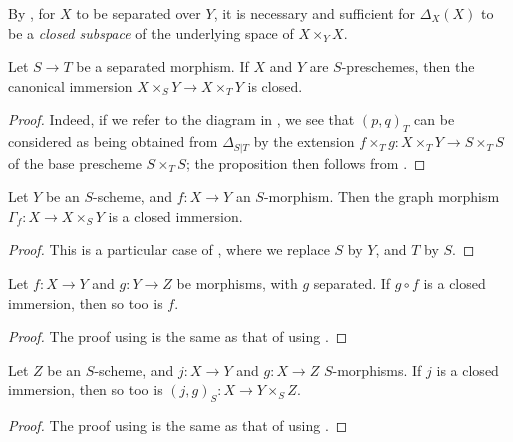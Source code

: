 By , for $X$ to be separated over $Y$, it is necessary and sufficient for $\Delta_X(X)$ to be a \emph{closed subspace} of the underlying space of $X\times_Y X$.

\begin{proposition}[5.4.2]
\label{1.5.4.2}
Let $S\to T$ be a separated morphism.
If $X$ and $Y$ are $S$-preschemes, then the canonical immersion $X\times_S Y\to X\times_T Y$  is closed.
\end{proposition}

\begin{proof}
\label{proof-1.5.4.2}
Indeed, if we refer to the diagram in , we see that $(p,q)_T$ can be considered as being obtained from $\Delta_{S|T}$ by the extension $f\times_T g:X\times_T Y\to S\times_T S$ of the base prescheme $S\times_T S$;
the proposition then follows from .
\end{proof}

\begin{corollary}[5.4.3]
\label{1.5.4.3}
Let $Y$ be an $S$-scheme, and $f:X\to Y$ an $S$-morphism.
Then the graph morphism $\Gamma_f:X\to X\times_S Y$  is a closed immersion.
\end{corollary}

\begin{proof}
\label{proof-1.5.4.3}
This is a particular case of , where we replace $S$ by $Y$, and $T$ by $S$.
\end{proof}

\begin{corollary}[5.4.4]
\label{1.5.4.4}
Let $f:X\to Y$ and $g:Y\to Z$ be morphisms, with $g$ separated.
If $g\circ f$ is a closed immersion, then so too is $f$.
\end{corollary}

\begin{proof}
\label{proof-1.5.4.4}
The proof using  is the same as that of  using .
\end{proof}

\begin{corollary}[5.4.5]
\label{1.5.4.5}
Let $Z$ be an $S$-scheme, and $j:X\to Y$ and $g:X\to Z$ $S$-morphisms.
If $j$ is a closed immersion, then so too is $(j,g)_S:X\to Y\times_S Z$.
\end{corollary}

\begin{proof}
\label{proof-1.5.4.5}
The proof using  is the same as that of  using .
\end{proof}

